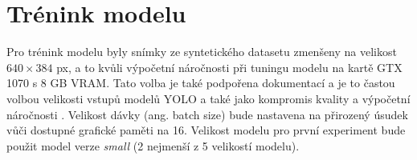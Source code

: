 \section{Trénink modelu}
\label{sec:Chapter42}
Pro trénink modelu byly snímky ze syntetického datasetu zmenšeny na velikost $640\times384$ px, a to kvůli výpočetní náročnosti při tuningu modelu na kartě GTX 1070 s 8 GB VRAM. Tato volba je také podpořena dokumentací a je to častou volbou velikosti vstupů modelů YOLO a také jako kompromis kvality a výpočetní náročnosti \cite{ultralytics_cfg_doc}. Velikost dávky (ang. batch size) bude nastavena na přirozený úsudek vůči dostupné grafické paměti na 16. Velikost modelu pro první experiment bude použit model verze \textit{small} (2 nejmenší z 5 velikostí modelu).